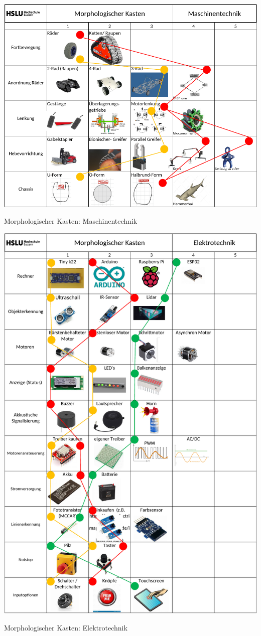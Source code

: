 \begin{table}[H]
\centering
\includegraphics[width=\textwidth]{assets/MK_Maschinentechnik.pdf}
\caption{Morphologischer Kasten: Maschinentechnik}
\label{table:MK-Maschinentechnik}
\end{table}
\newpage
\begin{table}[H]
\centering
\includegraphics[height=\textheight-1cm]{assets/MK_Elektrotechnik.pdf}
\caption{Morphologischer Kasten: Elektrotechnik}
\label{table:MK-Elektrotechnik}
\end{table}
